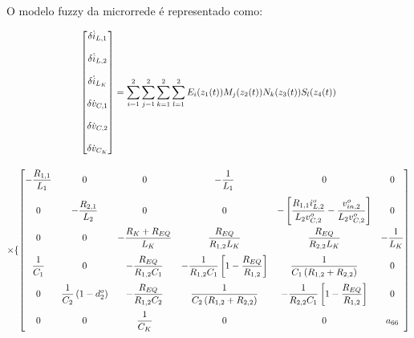 O modelo fuzzy da microrrede é representado como: 

\begin{gather}
    \begin{bmatrix}
    \delta \dot{i}_{L,1} \\[12pt] \delta \dot{i}_{L,2} \\[12pt] \delta \dot{i}_{L_K} \\[12pt]
    \delta \dot{v}_{C,1} \\[12pt] \delta \dot{v}_{C,2} \\[12pt] \delta \dot{v}_{C_K}
  \end{bmatrix} =
  \sum\limits_{i=1}^{2} \sum\limits_{j=1}^{2} \sum\limits_{k=1}^{2} \sum\limits_{l=1}^{2} E_i(z_1(t))M_j(z_2(t))N_k(z_3(t))S_l(z_4(t))
  \notag \\[12pt] \times
  \{
    \begin{bmatrix}
    \ds - \frac{R_{1,1}}{L_1} & 0                         & 0                                         & \ds - \frac{1}{L_1}                  & 0                                    & 0                           \\[12pt]
    0                         & \ds - \frac{R_{2,1}}{L_2} & 0                                         & 0                                    & \ds - \left[ \frac{R_{1,1} i_{L,2}^o}{L_2 v_{C,2}^o} - \frac{v_{in,2}^o}{L_2 v_{C,2}^o} \right]                  & 0                           \\[12pt]
    0                         & 0                         & - \ds \frac{R_K + R_{EQ}}{L_K}   & \ds \frac{R_{EQ}}{R_{1,2} L_K}              & \ds \frac{R_{EQ}}{R_{2,2} L_K}              & - \ds \frac{1}{L_K}         \\[12pt]
    \ds \frac{1}{C_1}         & 0                         & \ds - \frac{R_{EQ}}{R_{1,2} C_1}                 & \ds - \frac{1}{R_{1,2}C_1} \left[ 1 - \frac{R_{EQ}}{R_{1,2}} \right] & \ds \frac{1}{C_1 \left(R_{1,2} + R_{2,2}\right)}       & 0                           \\[12pt]
    0                         & \ds \frac{1}{C_2} \left( 1 - d_2^o \right)         & \ds - \frac{R_{EQ}}{R_{1,2} C_2} & \ds \frac{1}{C_2 \left(R_{1,2} + R_{2,2}\right)}      & \ds - \frac{1}{R_{2,2}C_1} \left[ 1 - \frac{R_{EQ}}{R_{1,2}} \right] & 0                           \\[12pt]
    0                         & 0                         & \ds \frac{1}{C_K}                         & 0                                    & 0                                    & a_{66}
  \end{bmatrix}

\end{gather}
